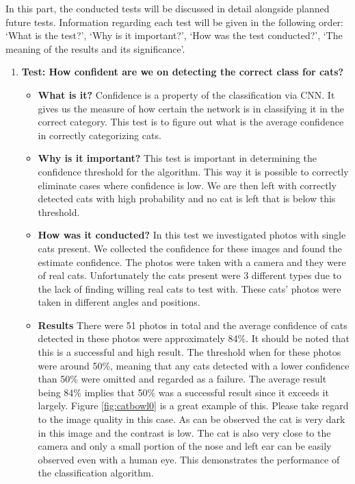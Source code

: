 In this part, the conducted tests will be discussed in detail alongside planned future tests. Information regarding each test will be given in the following order: `What is the test?', `Why is it important?', `How was the test conducted?', `The meaning of the results and its significance'.

\begin{enumerate}
    \item \textbf{Test: How confident are we on detecting the correct class for cats?}
    \begin{itemize}
        \item \textbf{What is it?} Confidence is a property of the classification via CNN. It gives us the measure of how certain the network is in classifying it in the correct category. This test is to figure out what is the average confidence in correctly categorizing cats.  
        \item \textbf{Why is it important?} This test is important in determining the confidence threshold for the algorithm. This way it is possible to correctly eliminate cases where confidence is low. We are then left with correctly detected cats with high probability and no cat is left that is below this threshold.
        \item \textbf{How was it conducted?} In this test we investigated photos with single cats present. We collected the confidence for these images and found the estimate confidence. The photos were taken with a camera and they were of real cats. Unfortunately the cats present were 3 different types due to the lack of finding willing real cats to test with. These cats' photos were taken in different angles and positions. 
        \item \textbf{Results} There were 51 photos in total and the average confidence of cats detected in these photos were approximately 84\%. It should be noted that this is a successful and high result. The threshold when for these photos were around 50\%, meaning that any cats detected with a lower confidence than 50\% were omitted and regarded as a failure. The average result being 84\% implies that 50\% was a successful result since it exceeds it largely. Figure \ref{fig:catbowl0} is a great example of this. Please take regard to the image quality in this case. As can be observed the cat is very dark in this image and the contrast is low. The cat is also very close to the camera and only a small portion of the nose and left ear can be easily observed even with a human eye. This demonstrates the performance of the classification algorithm. 
    \end{itemize}
    

\end{enumerate}
